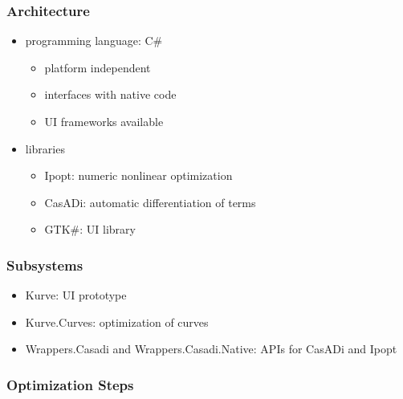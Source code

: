 \documentclass[mathserif]{beamer}
\begin{document}
		\begin{frame}
			\frametitle{Architecture}
			\begin{itemize}
				\item programming language: C\#
				\begin{itemize}
					\item platform independent
					\item interfaces with native code
					\item UI frameworks available
				\end{itemize}
				\item libraries
				\begin{itemize}
					\item Ipopt: numeric nonlinear optimization
					\item CasADi: automatic differentiation of terms
					\item GTK\#: UI library
				\end{itemize}
			\end{itemize}
		\end{frame}

		\begin{frame}
			\frametitle{Subsystems}
			\begin{itemize}
				\item Kurve: UI prototype
				\item Kurve.Curves: optimization of curves
				\item Wrappers.Casadi and Wrappers.Casadi.Native: APIs for CasADi and Ipopt
			\end{itemize}
		\end{frame}

		\begin{frame}
			\frametitle{Optimization Steps}
			\\
		\end{frame}
\end{document}
